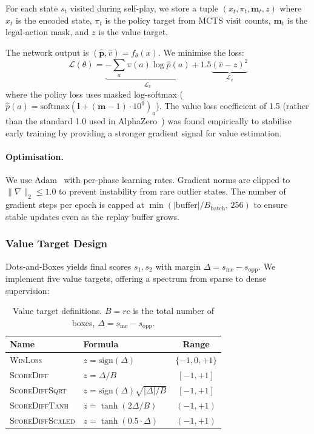 \documentclass[11pt]{article}
\begin{document}
For each state $s_t$ visited during self-play, we store a tuple
$(x_t, \pi_t, \mathbf{m}_t, z)$ where $x_t$ is the encoded state,
$\pi_t$ is the policy target from MCTS visit counts, $\mathbf{m}_t$ is
the legal-action mask, and $z$ is the value target.

The network output is $(\hat{\mathbf{p}}, \hat{v}) = f_\theta(x)$. We
minimise the loss:
\begin{equation}
  \mathcal{L}(\theta) =
    \underbrace{-\sum_a \pi(a) \log \hat{p}(a)}_{\mathcal{L}_\pi}
    + 1.5 \underbrace{(\hat{v} - z)^2}_{\mathcal{L}_v}
  \label{eq:loss}
\end{equation}
where the policy loss uses masked log-softmax
($\hat{p}(a) = \text{softmax}(\mathbf{l} + (\mathbf{m}-1)\cdot 10^9)_a$).
The value loss coefficient of 1.5 (rather than the standard 1.0 used in
AlphaZero~\cite{silver2018general}) was found empirically to stabilise
early training by providing a stronger gradient signal for value
estimation.

\paragraph{Optimisation.}
We use Adam~\cite{kingma2015adam} with per-phase learning rates.
Gradient norms are clipped to $\|\nabla\|_2 \le 1.0$ to prevent
instability from rare outlier states. The number of gradient steps per
epoch is capped at $\min(|\text{buffer}|/B_{\text{batch}},\, 256)$ to
ensure stable updates even as the replay buffer grows.

\subsubsection{Value Target Design}
\label{sec:valuetargets}

Dots-and-Boxes yields final scores $s_1, s_2$ with margin
$\Delta = s_{\text{me}} - s_{\text{opp}}$. We implement five value
targets, offering a spectrum from sparse to dense supervision:

\begin{table}[t]
\centering
\caption{Value target definitions. $B = rc$ is the total number of boxes,
$\Delta = s_{\text{me}} - s_{\text{opp}}$.}
\label{tab:valuetargets}
\begin{tabular}{llc}
\toprule
Name & Formula & Range \\
\midrule
\textsc{WinLoss} & $z = \text{sign}(\Delta)$ & $\{-1,0,+1\}$ \\
\textsc{ScoreDiff} & $z = \Delta / B$ & $[-1, +1]$ \\
\textsc{ScoreDiffSqrt} & $z = \text{sign}(\Delta)\sqrt{|\Delta|/B}$ & $[-1, +1]$ \\
\textsc{ScoreDiffTanh} & $z = \tanh(2\Delta / B)$ & $(-1, +1)$ \\
\textsc{ScoreDiffScaled} & $z = \tanh(0.5 \cdot \Delta)$ & $(-1, +1)$ \\
\bottomrule
\end{tabular}
\end{table}
\end{document}
